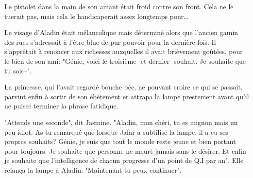 Le pistolet dans la main de son amant était froid contre son front. Cela ne le tuerait pas, mais cela le handicaperait assez longtemps pour…

\pagebreak[2]

Le visage d'Aladin était mélancolique mais déterminé alors que l'ancien gamin des rues s'adressait à l'être blue de pur pouvoir pour la dernière fois. Il s'apprêtait à renoncer aux richesses auxquelles il avait brièvement goûtées, pour le bien de son ami: "Génie, voici le troisième -et dernier- souhait. Je souhaite que tu sois--".

La princesse, qui l'avait regardé bouche bée, ne pouvant croire ce qui se passait, parvint enfin à sortir de son ébètement et attrapa la lampe prestement avant qu'il ne puisse terminer la phrase fatidique.

"Attends une seconde", dit Jasmine. "Aladin, mon chéri, tu es mignon mais un peu idiot. As-tu remarqué que lorsque Jafar a subtilisé la lampe, il a eu ses propres souhaits? Génie, je suis que tout le monde reste jeune et bien portant pour toujours. Je souhaite que personne ne meurt jamais sans le désirer. Et enfin je souhaite que l'intelligence de chacun progresse d'un point de Q.I par an". Elle relança la lampe à Aladin. "Maintenant tu peux continuer".

\pagebreak[2]
%
%


